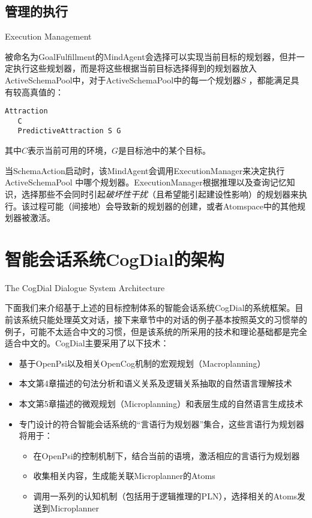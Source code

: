 \subsection{管理的执行}{Execution Management}
\label{Execution Management}

被命名为GoalFulfillment的MindAgent会选择可以实现当前目标的规划器，但并一定执行这些规划器，而是将这些根据当前目标选择得到的规划器放入ActiveSchemaPool中，对于ActiveSchemaPool中的每一个规划器$S$ ，都能满足具有较高真值的：

\begin{verbatim}
Attraction
   C
   PredictiveAttraction S G
\end{verbatim}

其中$C$表示当前可用的环境，$G$是目标池中的某个目标。

当SchemaAction启动时，该MindAgent会调用ExecutionManager来决定执行ActiveSchemaPool 中哪个规划器。ExecutionManager根据推理以及查询记忆知识，选择那些不会同时引起\textit{破坏性干扰}（且希望能引起建设性影响）的规划器来执行。该过程可能（间接地）会导致新的规划器的创建，或者Atomspace中的其他规划器被激活。


\section{智能会话系统CogDial的架构}{The CogDial Dialogue System Architecture}

下面我们来介绍基于上述的目标控制体系的智能会话系统CogDial的系统框架。目前该系统只能处理英文对话，接下来章节中的对话的例子基本按照英文的习惯举的例子，可能不太适合中文的习惯，但是该系统的所采用的技术和理论基础都是完全适合中文的。CogDial主要采用了以下技术：

\begin{itemize}
\item  基于OpenPsi以及相关OpenCog机制的宏观规划（Macroplanning）
\item  本文第4章描述的句法分析和语义关系及逻辑关系抽取的自然语言理解技术
\item  本文第5章描述的微观规划（Microplanning）和表层生成的自然语言生成技术
\item  专门设计的符合智能会话系统的“言语行为规划器”集合，这些言语行为规划器将用于：
\begin{itemize}
    \item 在OpenPsi的控制机制下，结合当前的语境，激活相应的言语行为规划器
    \item 收集相关内容，生成能关联Microplanner的Atoms
    \item  调用一系列的认知机制（包括用于逻辑推理的PLN），选择相关的Atoms发送到Microplanner
\end{itemize}
\end{itemize}

